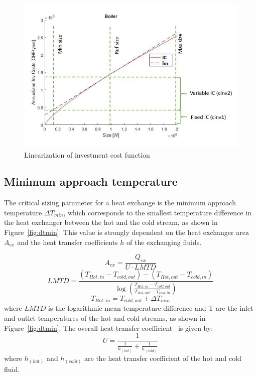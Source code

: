 \documentclass{article}
\begin{document}
\begin{figure}[htp]
	\centering
	\includegraphics[scale=0.6]{Images/linearization_expl.jpg}
	\caption{Linearization of investment cost function}
	\label{fig:lin}
\end{figure}

\subsection{Minimum approach temperature}\label{ss:dtmin}
The critical sizing parameter for a heat exchange is the minimum approach temperature $\Delta T_{min}$, which corresponds to the smallest temperature difference in the heat exchanger between the hot and the cold stream, as shown in Figure~\ref{fig:dtmin}. This value is strongly dependent on the heat exchanger area $A_{ex}$ and the heat transfer coefficients $h$ of the exchanging fluids. 

\begin{equation}\label{eq:HEX_area}
A_{ex} = \frac{Q_{ex}}{U \cdot LMTD}
\end{equation}
\begin{equation}\label{eq:LMTD}
LMTD= \frac{(T_{Hot,in } - T_{cold,out }) - (T_{Hot,out } - T_{cold,in }) }{ \log{ (\frac{T_{Hot,in } - T_{cold,out }}{T_{Hot,out } - T_{cold,in }} ) }}
\end{equation}
\begin{equation}
	T_{Hot,in } = T_{cold,out} + \Delta T_{min}
\end{equation}
where  $LMTD$ is the logarithmic mean temperature difference and T are the inlet and outlet temperatures of the hot and cold streams, as shown in Figure~\ref{fig:dtmin}. The overall heat transfer coefficient~\cite{huExtremumSeekingControl2015} is given by:
\begin{equation}\label{eq:alpha}
U= \frac{1}{ \frac{1}{h_{(hot)} } + \frac{1}{h_{(cold)}} }
\end{equation}
where $h_{(hot)}$ and $h_{(cold)}$ are the heat transfer coefficient of the hot and cold fluid.
\end{document}
